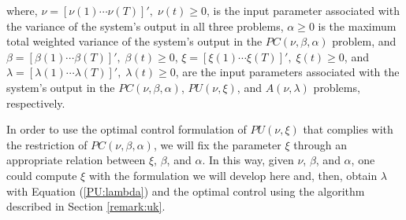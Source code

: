     where, $\nu=[\nu(1) \cdots \nu(T) ]',\; \nu(t) \geqslant 0$, is the input parameter associated with the variance of the system's output in all three problems, $\alpha \geqslant 0$ is the maximum total weighted variance of the system's output in the $PC(\nu,\beta,\alpha)$ problem, and $ \beta = [\beta(1) \cdots \beta(T)]', \; \beta(t) \geqslant 0$,  $\xi=[\xi(1) \cdots \xi(T) ]',\;\xi(t) \geqslant 0$, and $\lambda=[\lambda(1) \cdots \lambda(T) ]',\; \lambda(t) \geqslant 0$,  are the input parameters associated with the system's output in the $PC(\nu,\beta,\alpha)$, $PU(\nu,\xi)$, and $A(\nu, \lambda)$ problems, respectively.

    In order to use the optimal control formulation of $PU(\nu,\xi)$ that complies with the restriction of $PC(\nu,\beta,\alpha)$, we will fix the parameter $\xi$ through an appropriate relation between $\xi$, $\beta$, and $\alpha$. In this way, given $\nu$, $\beta$, and $\alpha$, one could compute $\xi$ with the formulation we will develop here and, then, obtain $\lambda$ with Equation (\ref{PU:lambda}) and the optimal control using the algorithm described in Section \ref{remark:uk}.
